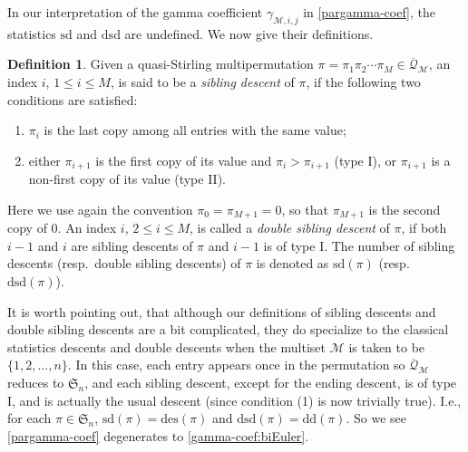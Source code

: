 \documentclass[11pt,reqno]{amsart}
\numberwithin{equation}{section}
\theoremstyle{plain}
\theoremstyle{definition}
\newtheorem{Def}[theorem]{Definition}
\newcommand{\s}{\mathfrak{S}}
\newcommand{\Q}{\mathcal{Q}}
\newcommand{\M}{\mathcal{M}}
\def\des{\mathrm{des}}
\def\ddes{\mathrm{dd}}
\def\sdes{\mathrm{sd}}
\def\sddes{\mathrm{dsd}}
\begin{document}
In our interpretation of the gamma coefficient $\gamma_{\M,i,j}$ in \eqref{pargamma-coef}, the statistics $\sdes$ and $\sddes$ are undefined. We now give their definitions. 
\begin{Def}\label{def:sdes}
Given a quasi-Stirling multipermutation $\pi=\pi_1\pi_2\cdots\pi_M\in\overline{\Q}_{\M}$, an index $i$, $1\le i\le M$, is said to be a {\em sibling descent} of $\pi$, if the following two conditions are satisfied:
\begin{enumerate}
	\item $\pi_i$ is the last copy among all entries with the same value;
	\item either $\pi_{i+1}$ is the first copy of its value and $\pi_i>\pi_{i+1}$ (type I), or $\pi_{i+1}$ is a non-first copy of its value (type II).
\end{enumerate}
Here we use again the convention $\pi_0=\pi_{M+1}=0$, so that $\pi_{M+1}$ is the second copy of $0$. An index $i$, $2\le i\le M$, is called a {\em double sibling descent} of $\pi$, if both $i-1$ and $i$ are sibling descents of $\pi$ and $i-1$ is of type I. The number of sibling descents (resp.~double sibling descents) of $\pi$ is denoted as $\sdes(\pi)$ (resp.~$\sddes(\pi)$).
\end{Def}

It is worth pointing out, that although our definitions of sibling descents and double sibling descents are a bit complicated, they do specialize to the classical statistics descents and double descents when the multiset $\M$ is taken to be $\{1,2,\ldots,n\}$. In this case, each entry appears once in the permutation so $\overline{\Q}_{\M}$ reduces to $\s_n$, and each sibling descent, except for the ending descent, is of type I, and is actually the usual descent (since condition (1) is now trivially true). I.e., for each $\pi\in\s_n$, $\sdes(\pi)=\des(\pi)$ and $\sddes(\pi)=\ddes(\pi)$. So we see \eqref{pargamma-coef} degenerates to \eqref{gamma-coef:biEuler}.
\end{document}
